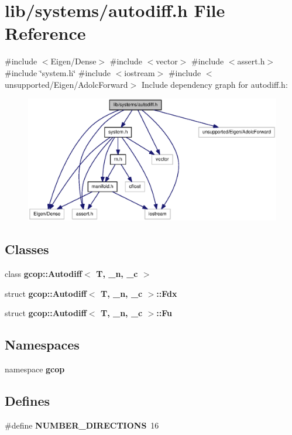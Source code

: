 \section{lib/systems/autodiff.h \-File \-Reference}
\label{autodiff_8h}
{\ttfamily \#include $<$\-Eigen/\-Dense$>$}\*
{\ttfamily \#include $<$vector$>$}\*
{\ttfamily \#include $<$assert.\-h$>$}\*
{\ttfamily \#include \char`\"{}system.\-h\char`\"{}}\*
{\ttfamily \#include $<$iostream$>$}\*
{\ttfamily \#include $<$unsupported/\-Eigen/\-Adolc\-Forward$>$}\*
\-Include dependency graph for autodiff.\-h\-:
\nopagebreak
\begin{figure}[H]
\begin{center}
\leavevmode
\includegraphics[width=350pt]{autodiff_8h__incl}
\end{center}
\end{figure}
\subsection*{\-Classes}
\begin{DoxyCompactItemize}
\item 
class {\bf gcop\-::\-Autodiff$<$ T, \-\_\-n, \-\_\-c $>$}
\item 
struct {\bf gcop\-::\-Autodiff$<$ T, \-\_\-n, \-\_\-c $>$\-::\-Fdx}
\item 
struct {\bf gcop\-::\-Autodiff$<$ T, \-\_\-n, \-\_\-c $>$\-::\-Fu}
\end{DoxyCompactItemize}
\subsection*{\-Namespaces}
\begin{DoxyCompactItemize}
\item 
namespace {\bf gcop}
\end{DoxyCompactItemize}
\subsection*{\-Defines}
\begin{DoxyCompactItemize}
\item 
\#define {\bf \-N\-U\-M\-B\-E\-R\-\_\-\-D\-I\-R\-E\-C\-T\-I\-O\-N\-S}~16
\end{DoxyCompactItemize}


